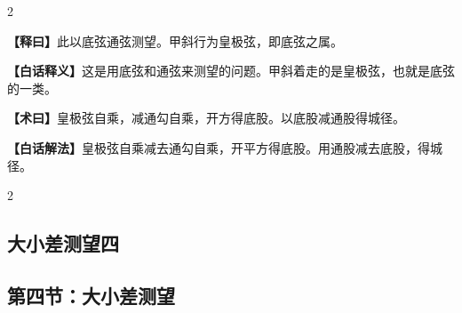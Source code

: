 \documentclass[11pt,a4paper]{article}
\newcommand{\WenExplain}{\textcolor{classicalcolor}{\textbf{【释曰】}}}
\newcommand{\BaiExplain}{\textcolor{moderncolor}{\textbf{【白话释义】}}}
\newcommand{\WenMethod}{\textcolor{classicalcolor}{\textbf{【术曰】}}}
\newcommand{\BaiMethod}{\textcolor{moderncolor}{\textbf{【白话解法】}}}
\begin{document}
\begin{paracol}{2}
\switchcolumn*
\begin{tcolorbox}[colback=red!5,colframe=red!30!black,boxrule=0.3pt]
\WenExplain\quad 此以底弦通弦测望。甲斜行为皇极弦，即底弦之属。
\end{tcolorbox}
\switchcolumn
\begin{tcolorbox}[colback=blue!5,colframe=blue!30!black,boxrule=0.3pt]
\BaiExplain\quad 这是用底弦和通弦来测望的问题。甲斜着走的是皇极弦，也就是底弦的一类。
\end{tcolorbox}

\switchcolumn*
\begin{tcolorbox}[colback=red!5,colframe=red!40!black,boxrule=0.3pt]
\WenMethod\quad 皇极弦自乘，减通勾自乘，开方得底股。以底股减通股得城径。
\end{tcolorbox}
\switchcolumn
\begin{tcolorbox}[colback=blue!5,colframe=blue!40!black,boxrule=0.3pt]
\BaiMethod\quad 皇极弦自乘减去通勾自乘，开平方得底股。用通股减去底股，得城径。
\end{tcolorbox}

\end{paracol}

\vspace{0.5em}

\begin{paracol}{2}
\subsection*{\textcolor{sectioncolor}{大小差测望四}}
\switchcolumn
\subsection*{\textcolor{sectioncolor}{第四节：大小差测望}}
\end{paracol}

\vspace{0.5em}
\end{document}
